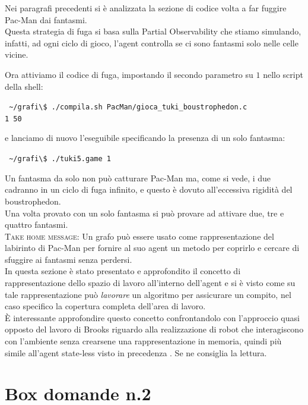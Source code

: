 \documentclass[8pt]{book}
\begin{document}
Nei paragrafi precedenti si è analizzata la sezione di codice volta a far fuggire Pac-Man dai fantasmi.\\
Questa strategia di fuga si basa sulla Partial Observability che stiamo simulando, infatti, ad ogni ciclo di gioco, l'agent controlla se ci sono fantasmi solo nelle celle vicine.

Ora attiviamo il codice di fuga, impostando il secondo parametro su $1$ nello script della shell:

\texttt{
  \textasciitilde{}/grafi\textbackslash{}\$ ./compila.sh PacMan/gioca\_tuki\_boustrophedon.c\\ 1 50
}

e lanciamo di nuovo l'eseguibile specificando la presenza di un solo fantasma:

\texttt{
\textasciitilde{}/grafi\textbackslash{}\$ ./tuki5.game 1
}

Un fantasma da solo non può catturare Pac-Man ma, come si vede, i due cadranno in un ciclo di fuga infinito, e questo è dovuto all'eccessiva rigidità del boustrophedon.\\
Una volta provato con un solo fantasma si può provare ad attivare due, tre e quattro fantasmi.\\

\textsc{Take home message:} Un grafo può essere usato come rappresentazione del labirinto di Pac-Man per fornire al suo agent un metodo per coprirlo e cercare di sfuggire ai fantasmi senza perdersi.\\

In questa sezione è stato presentato e approfondito il concetto di rappresentazione dello spazio di lavoro all'interno dell'agent e si è visto come su tale rappresentazione può \emph{lavorare} un algoritmo per assicurare un compito, nel caso specifico la copertura completa dell'area di lavoro.\\
È interessante approfondire questo concetto confrontandolo con l'approccio quasi opposto del lavoro di Brooks riguardo alla realizzazione di robot che interagiscono con l'ambiente senza crearsene una rappresentazione in memoria, quindi più simile all'agent state-less visto in precedenza \cite{Brooks}. Se ne consiglia la lettura.

\newpage
\section*{Box domande n.2}
\end{document}
